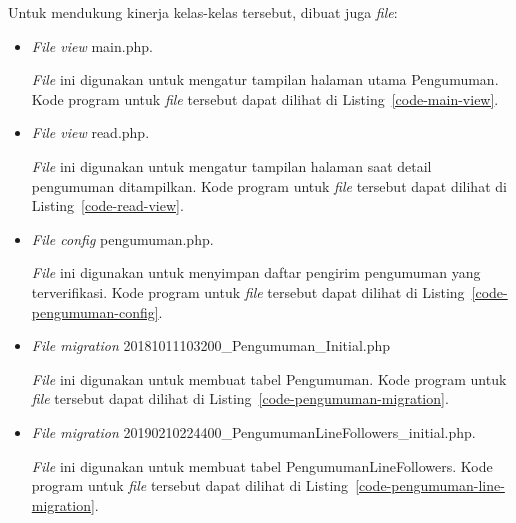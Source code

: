 Untuk mendukung kinerja kelas-kelas tersebut, dibuat juga \textit{file}:
\begin{itemize}
\item \textit{File view} main.php.

\textit{File} ini digunakan untuk mengatur tampilan halaman utama Pengumuman. Kode program untuk \textit{file} tersebut dapat dilihat di Listing~\ref{code-main-view}.



\item \textit{File view} read.php.

\textit{File} ini digunakan untuk mengatur tampilan halaman saat detail pengumuman ditampilkan. Kode program untuk \textit{file} tersebut dapat dilihat di Listing~\ref{code-read-view}.



\item \textit{File config} pengumuman.php.

\textit{File} ini digunakan untuk menyimpan daftar pengirim pengumuman yang terverifikasi. Kode program untuk \textit{file} tersebut dapat dilihat di Listing~\ref{code-pengumuman-config}.



\item \textit{File migration} 20181011103200\_Pengumuman\_Initial.php 

\textit{File} ini digunakan untuk membuat tabel Pengumuman. Kode program untuk \textit{file} tersebut dapat dilihat di Listing~\ref{code-pengumuman-migration}.



\item \textit{File migration} 20190210224400\_PengumumanLineFollowers\_initial.php.

\textit{File} ini digunakan untuk membuat tabel PengumumanLineFollowers. Kode program untuk \textit{file} tersebut dapat dilihat di Listing~\ref{code-pengumuman-line-migration}.



\end{itemize}

